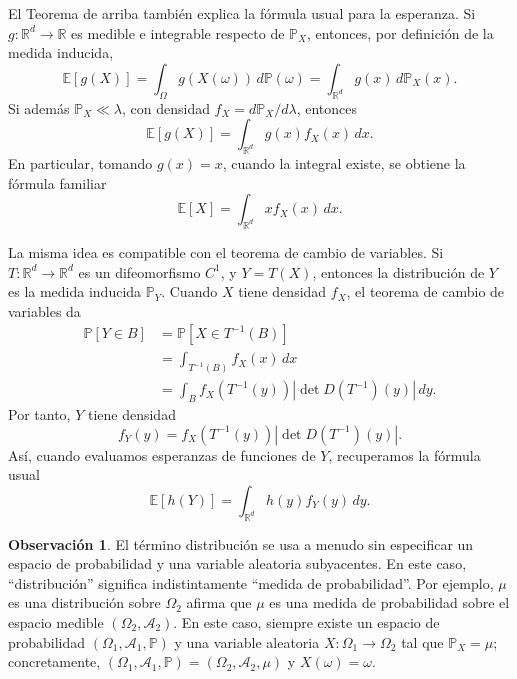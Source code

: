 \documentclass[11pt]{report}
\theoremstyle{definition}
\newtheorem{observacion}[definicion]{Observación}
\theoremstyle{plain}
\numberwithin{equation}{section}
\begin{document}
El Teorema de arriba también explica la fórmula usual para la esperanza. Si \(g:\mathbb{R}^d\to\mathbb{R}\) es medible e integrable respecto de \(\mathbb{P}_X\), entonces, por definición de la medida inducida,
\begin{equation*}
    \mathbb{E}[g(X)]
    =
    \int_\Omega g(X(\omega))\,d\mathbb{P}(\omega)
    =
    \int_{\mathbb{R}^d} g(x)\,d\mathbb{P}_X(x).
\end{equation*}
Si además \(\mathbb{P}_X\ll\lambda\), con densidad \(f_X=d\mathbb{P}_X/d\lambda\), entonces
\begin{equation*}
    \mathbb{E}[g(X)]
    =
    \int_{\mathbb{R}^d} g(x)f_X(x)\,dx.
\end{equation*}
En particular, tomando \(g(x)=x\), cuando la integral existe, se obtiene la fórmula familiar
\begin{equation*}
    \mathbb{E}[X]
    =
    \int_{\mathbb{R}^d} x f_X(x)\,dx.
\end{equation*}

La misma idea es compatible con el teorema de cambio de variables. Si \(T:\mathbb{R}^d\to\mathbb{R}^d\) es un difeomorfismo \(C^1\), y \(Y=T(X)\), entonces la distribución de \(Y\) es la medida inducida \(\mathbb{P}_Y\). Cuando \(X\) tiene densidad \(f_X\), el teorema de cambio de variables da
\begin{align*}
    \mathbb{P}[Y\in B]
    &=
    \mathbb{P}[X\in T^{-1}(B)]\\
    &=
    \int_{T^{-1}(B)} f_X(x)\,dx\\
    &=
    \int_B f_X(T^{-1}(y))
    \left|\det D(T^{-1})(y)\right|\,dy.
\end{align*}
Por tanto, \(Y\) tiene densidad
\begin{equation*}
    f_Y(y)
    =
    f_X(T^{-1}(y))
    \left|\det D(T^{-1})(y)\right|.
\end{equation*}
Así, cuando evaluamos esperanzas de funciones de \(Y\), recuperamos la fórmula usual
\begin{equation*}
    \mathbb{E}[h(Y)]
    =
    \int_{\mathbb{R}^d}h(y)f_Y(y)\,dy.
\end{equation*}

\begin{observacion}
El término distribución se usa a menudo sin especificar un espacio de probabilidad y una variable aleatoria subyacentes. En este caso, ``distribución'' significa indistintamente ``medida de probabilidad''. Por ejemplo, \(\mu\) es una distribución sobre \(\Omega_2\) afirma que \(\mu\) es una medida de probabilidad sobre el espacio medible \((\Omega_2,\mathcal{A}_2)\). En este caso, siempre existe un espacio de probabilidad \((\Omega_1,\mathcal{A}_1,\mathbb{P})\) y una variable aleatoria \(X:\Omega_1\to\Omega_2\) tal que \(\mathbb{P}_X=\mu\); concretamente, \((\Omega_1,\mathcal{A}_1,\mathbb{P})=(\Omega_2,\mathcal{A}_2,\mu)\) y \(X(\omega)=\omega\).
\end{observacion}
\end{document}
